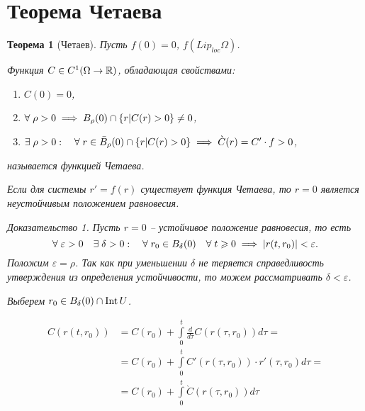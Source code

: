 \documentclass[a5paper, 10pt]{article}
\theoremstyle{definition}
\theoremstyle{plain}
\newtheorem{Th}{Теорема}
\theoremstyle{remark}
\newtheorem*{Proof}{Доказательство}
\begin{document}
	\section{Теорема Четаева}
	\begin{Th}[Четаев]
		Пусть $f(0) = 0$, $f(Lip_{loc} \Omega)$.
		
		Функция $C \in C^1(\Omega \rightarrow \mathbb{R})$, обладающая свойствами:
		\begin{enumerate}
			\item[\boxed{1}] $C(0) = 0$,
			\item[\boxed{2}] $\forall \; \rho > 0 \implies B_{\rho}(0) \cap \left\{r | C(r) > 0\right\} \not= 0$,
			\item[\boxed{3}] $\exists\; \rho>0: \quad \forall \; r \in \bar{B}_{\rho}(0) \cap \left\{r|C(r)>0\right\} \implies \grave{C}(r) = C' \cdot f > 0$,
		\end{enumerate}
		называется функцией Четаева. 
		
		Если для системы $r'=f(r)$ существует функция Четаева, то $r=0$ является неустойчивым положением равновесия.
		\begin{Proof}
			Пусть $r=0$ -- устойчивое положение равновесия, то есть
			\[
			\forall \; \varepsilon>0 \quad \exists\; \delta > 0: \quad \forall \; r_0 \in B_{\delta}(0) \quad \forall \; t \geqslant 0 \implies \left|r(t,r_0)\right|<\varepsilon.
			\]
			Положим $\varepsilon=\rho$. Так как при уменьшении $\delta$ не теряется  справедливость утверждения из определения устойчивости, то можем рассматривать $\delta<\varepsilon$.
			
			Выберем $r_0 \in B_\delta(0) \cap \operatorname{Int} U$.
			\begin{figure}[h!]
				\centering
			\end{figure}
		\[
		\begin{split}
		C(r(t,r_0)) &= C(r_0) + \int\limits_0^t \frac{d}{d\tau} C(r(\tau, r_0))d\tau =\\
		&= C(r_0) + \int\limits_0^t C'(r(\tau,r_0))\cdot r'(\tau, r_0) d\tau =\\
		&= C(r_0) + \int\limits_0^t \grave{C}(r(\tau, r_0))d\tau
		\end{split}
		\]
		

\end{Proof}
\end{Th}
\end{document}

